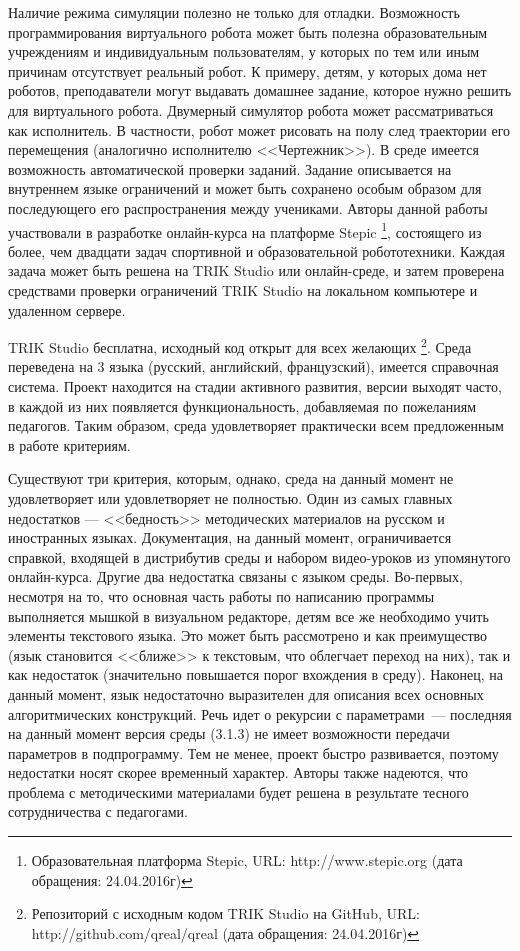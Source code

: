 \documentclass[a5paper]{article}
\begin{document}
Наличие режима симуляции полезно не только для отладки. Возможность программирования виртуального робота может 
быть полезна образовательным учреждениям и индивидуальным пользователям, у которых по тем или иным причинам 
отсутствует реальный робот. К примеру, детям, у которых дома нет роботов, преподаватели могут выдавать домашнее 
задание, которое нужно решить для виртуального робота. Двумерный симулятор робота может рассматриваться как 
исполнитель. В частности, робот может рисовать на полу след траектории его перемещения (аналогично исполнителю 
<<Чертежник>>). В среде имеется возможность автоматической проверки заданий. Задание описывается на внутреннем 
языке ограничений и может быть сохранено особым образом для последующего его распространения между учениками. 
Авторы данной работы участвовали в разработке онлайн-курса на платформе Stepic%
\footnote{Образовательная платформа Stepic, URL: http://www.stepic.org (дата обращения: 24.04.2016г)}, 
состоящего из более, чем двадцати 
задач спортивной и образовательной робототехники. Каждая задача может быть решена на TRIK Studio или онлайн-среде, 
и затем проверена средствами проверки ограничений TRIK Studio на локальном компьютере и удаленном сервере.

TRIK Studio бесплатна, исходный код открыт для всех желающих%
\footnote{Репозиторий с исходным кодом TRIK Studio на GitHub, 
URL: http://github.com/qreal/qreal (дата обращения: 24.04.2016г)}. 
Среда переведена на 3 языка (русский, английский, 
французский), имеется справочная система. Проект находится на стадии активного развития, версии выходят часто, 
в каждой из них появляется функциональность, добавляемая по пожеланиям педагогов. Таким образом, среда 
удовлетворяет практически всем предложенным в работе критериям. 

Существуют три критерия, которым, однако, среда на данный момент не удовлетворяет или удовлетворяет не полностью. 
Один из самых главных недостатков --- <<бедность>> методических материалов на русском и иностранных языках. 
Документация, на данный момент, ограничивается справкой, входящей в дистрибутив среды и набором видео-уроков 
из упомянутого онлайн-курса. Другие два недостатка связаны с языком среды. Во-первых, несмотря на то, 
что основная часть работы по написанию программы выполняется мышкой в визуальном редакторе, детям все же 
необходимо учить элементы текстового языка. Это может быть рассмотрено и как преимущество (язык становится 
<<ближе>> к текстовым, что облегчает переход на них), так и как недостаток (значительно повышается порог 
вхождения в среду). Наконец, на данный момент, язык недостаточно выразителен для описания всех основных 
алгоритмических конструкций. Речь идет о рекурсии с параметрами~--- последняя на данный момент версия среды 
(3.1.3) не имеет возможности передачи параметров в подпрограмму. Тем не менее, проект быстро развивается, 
поэтому недостатки носят скорее временный характер. Авторы также надеются, что проблема с методическими 
материалами будет решена в результате тесного сотрудничества с педагогами.
\end{document}
